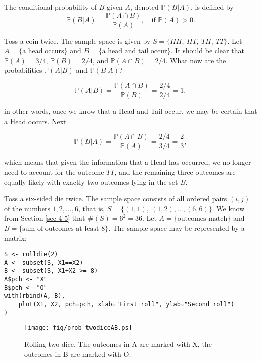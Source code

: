 \begin{defn}
The conditional probability of \(B\) given \(A\), denoted
\(\mathbb{P}(B|A)\), is defined by
\begin{equation}
\mathbb{P}(B|A)=\frac{\mathbb{P}(A\cap B)}{\mathbb{P}(A)},\quad \mbox{if }\mathbb{P}(A)>0.
\end{equation}
\end{defn}


Toss a coin twice. The sample space is given by \(S=\{ HH,\ HT,\ TH,\
TT \} \). Let \(A= \{ \mbox{a head occurs} \} \) and \(B= \{ \mbox{a
head and tail occur} \} \). It should be clear that
\(\mathbb{P}(A)=3/4\), \(\mathbb{P}(B)=2/4\), and \(\mathbb{P}(A\cap
B)=2/4\). What now are the probabilities \(\mathbb{P}(A|B)\) and
\(\mathbb{P}(B|A)\)?  

\[ \mathbb{P}(A|B)=\frac{\mathbb{P}(A\cap
B)}{\mathbb{P}(B)}=\frac{2/4}{2/4}=1, \] 

in other words, once we know that a Head and Tail occur, we may be
certain that a Head occurs. Next

\[ 
\mathbb{P}(B|A)=\frac{\mathbb{P}(A\cap
B)}{\mathbb{P}(A)}=\frac{2/4}{3/4}=\frac{2}{3}, 
\] 

which means that given the information that a Head has occurred, we no
longer need to account for the outcome \(TT\), and the remaining three
outcomes are equally likely with exactly two outcomes lying in the set
\(B\).



\label{exa-Toss-a-six-sided-die-twice} Toss a six-sided die twice. The
sample space consists of all ordered pairs \((i,j)\) of the numbers
\(1,2,\ldots,6\), that is, \( S = \{ (1,1),\ (1,2),\ldots,(6,6) \}
\). We know from Section \ref{sec-4-5} that \( \# (S) =
6^{2} = 36 \). Let \( A = \{ \mbox{outcomes match} \} \) and \( B = \{
\mbox{sum of outcomes at least 8} \} \). The sample space may be
represented by a matrix:

\begin{Verbatim}
S <- rolldie(2)
A <- subset(S, X1==X2)
B <- subset(S, X1+X2 >= 8)
A$pch <- "X"
B$pch <- "O"
with(rbind(A, B),
    plot(X1, X2, pch=pch, xlab="First roll", ylab="Second roll")
)
\end{Verbatim}

\begin{figure}[ht!]
\centering
\texttt{[image: fig/prob-twodiceAB.ps]}
\caption[Rolling two dice]{\label{fig-twodiceAB}\small Rolling two dice. The outcomes in A are marked with X, the outcomes in B are marked with O.}
\end{figure}

